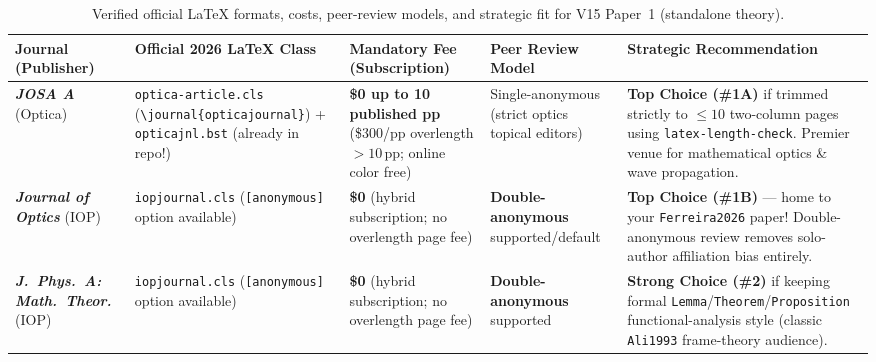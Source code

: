 \documentclass[10pt,letterpaper]{article}
\begin{document}
\begin{table}[t]
\centering
\caption{Verified official LaTeX formats, costs, peer-review models, and strategic fit for V15 Paper~1 (standalone theory).}
\label{tab:p1_journals}
\scriptsize
\renewcommand{\arraystretch}{1.16}
\begin{tabularx}{\linewidth}{@{}l>{\raggedright\arraybackslash}p{3.0cm}>{\raggedright\arraybackslash}p{2.5cm}>{\raggedright\arraybackslash}p{2.6cm}>{\raggedright\arraybackslash}X@{}}
\toprule
\textbf{Journal (Publisher)} & \textbf{Official 2026 LaTeX Class} & \textbf{Mandatory Fee (Subscription)} & \textbf{Peer Review Model} & \textbf{Strategic Recommendation} \\
\midrule
\rowcolor{greenbg}
\textbf{\emph{JOSA A}} (Optica) & \texttt{optica-article.cls} (\texttt{\textbackslash journal\{opticajournal\}}) + \texttt{opticajnl.bst} (already in repo!) & \textbf{\$0 up to 10 published pp} (\$300/pp overlength $>10\,$pp; online color free) & Single-anonymous (strict optics topical editors) & \textbf{Top Choice (\#1A)} if trimmed strictly to $\le 10$ two-column pages using \texttt{latex-length-check}. Premier venue for mathematical optics \& wave propagation. \\
\rowcolor{greenbg}
\textbf{\emph{Journal of Optics}} (IOP) & \texttt{iopjournal.cls} (\texttt{[anonymous]} option available) & \textbf{\$0} (hybrid subscription; no overlength page fee) & \textbf{Double-anonymous} supported/default & \textbf{Top Choice (\#1B)} --- home to your \texttt{Ferreira2026} paper! Double-anonymous review removes solo-author affiliation bias entirely. \\
\textbf{\emph{J.\ Phys.\ A: Math.\ Theor.}} (IOP) & \texttt{iopjournal.cls} (\texttt{[anonymous]} option available) & \textbf{\$0} (hybrid subscription; no overlength page fee) & \textbf{Double-anonymous} supported & \textbf{Strong Choice (\#2)} if keeping formal \texttt{Lemma}/\texttt{Theorem}/\texttt{Proposition} functional-analysis style (classic \texttt{Ali1993} frame-theory audience). \\
\bottomrule
\end{tabularx}
\end{table}
\end{document}
